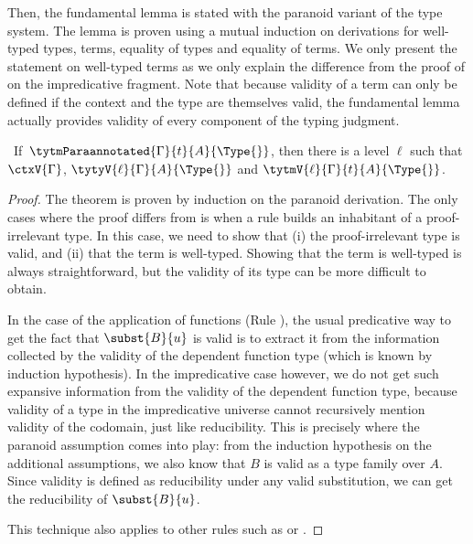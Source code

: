 %
Then, the fundamental lemma is stated with the paranoid variant of the type
system. The lemma is proven using a mutual induction on derivations for well-typed types, terms, equality of
types and equality of terms. We only present the statement on
well-typed terms as we only explain the difference from the proof of
 on the impredicative fragment.
%
Note that because validity of a term can only be defined if the
context and the type are themselves valid, the fundamental lemma
actually provides validity of every component of the typing judgment.
%
\begin{lemma}
  \label{thm:fundamental}
  \
  If\, \( \tytmParaannotated{\Gamma}{t}{A}{\Type{}} \), then there is a level \( \ell \) such that $\ctxV{\Gamma}$,
  \( \tytyV{\ell}{\Gamma}{A}{\Type{}} \) and \( \tytmV{\ell}{\Gamma}{t}{A}{\Type{}} \).
\end{lemma}
\begin{proof}
  The theorem is proven by induction on the paranoid derivation.
  The only cases where the proof differs from
   is when a rule builds
  an inhabitant of a proof-irrelevant type. In this case, we need
  to show that (i) the proof-irrelevant type is valid, and
  (ii) that the term is well-typed.
  Showing that the term is well-typed is always straightforward, but
  the validity of its type can be more difficult to obtain.

  In the case of the application of functions (Rule ), the usual
  predicative way to get the fact that ${\subst{B}{u}}$ is valid
  is to extract it from the information collected by the
  validity of the dependent function type (which is known
  by induction hypothesis).
  In the impredicative case however, we do not get such expansive information
  from the validity of the dependent function type, because validity
  of a type in the impredicative universe cannot recursively mention validity of the codomain, just like reducibility.
  This is precisely where the paranoid assumption comes into play:
  from the induction hypothesis on the additional assumptions, we also
  know that $B$ is valid as a type family over $A$. Since validity is
  defined as reducibility under any valid substitution, we can get the
  reducibility of ${\subst{B}{u}}$.

  This technique also applies to other rules such as 
  or \nameref{infrule:snd-Para}.
\end{proof}

